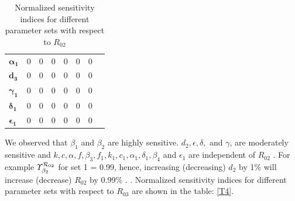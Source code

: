 \begin{table}
\begin{tabular}{|p{3cm}|p{1.6cm}|p{1.6cm}|p{1.6cm}|p{1.6cm}|p{1.6cm}|p{1.6cm}|p{1.6cm}|}
  $\boldsymbol {\alpha_{1}}$          & 0 & 0 & 0 & 0 & 0 & 0  \\
  $\mathbf{d_{3}}$          & 0 & 0 & 0 & 0 & 0 & 0  \\
  $\boldsymbol {\gamma_{1}}$          & 0 & 0 & 0 & 0 & 0 & 0  \\
  $\boldsymbol {\delta_{1}}$         & 0 & 0 & 0 & 0 & 0 & 0  \\
  $\boldsymbol {\epsilon_{1}}$          & 0 & 0 & 0 & 0 & 0 & 0  \\
  \hline
    \end{tabular}
\caption{Normalized sensitivity indices for different parameter sets with respect to $R_{02}$}\label{T3}
\end{table}
\noindent We observed that $\beta_{1}$ and $\beta_{2}$  are highly sensitive. $d_{2}, \epsilon, \delta,$ and $ \gamma$, are moderately sensitive and $k, c, \alpha,f, \beta_{3}, f_{1}, k_{1}, c_{1}, \alpha_{1}, \delta_{1},\beta_{4}$  and $\epsilon_{1}$ are independent of $R_{02}$ . For example $\varUpsilon^{{{\cal R}}_{02}}_{\beta_{2}}$ for set 1 = 0.99, hence, increasing (decreasing) $d_{2}$ by 1\%  will increase (decrease) $R_{02}$  by 0.99\% .
\newpage
{}. Normalized sensitivity indices for different parameter sets with respect to $R_{03}$ are shown in the table: \ref{T4}.\\

